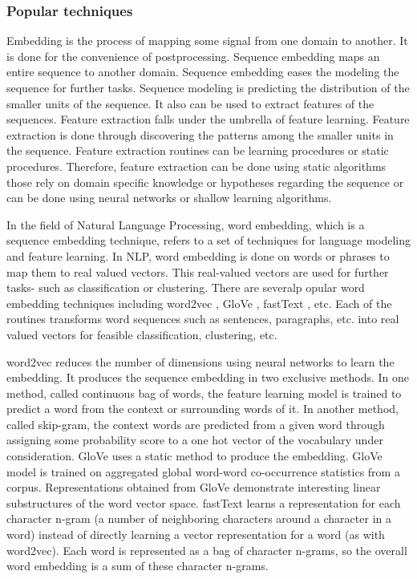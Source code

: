 \documentclass[oneside, twocolumn, a4paper, 10pt]{IEEEtran}
\begin{document}
\subsubsection{Popular techniques}
Embedding is the process of mapping some signal from one domain to another. It is done for the convenience of postprocessing. Sequence embedding maps an entire sequence to another domain. Sequence embedding eases the modeling the sequence for further tasks. Sequence modeling is predicting the distribution of the smaller units of the sequence. It also can be used to extract features of the sequences. Feature extraction falls under the umbrella of feature learning. Feature extraction is done through discovering the patterns among the smaller units in the sequence. Feature extraction routines can be learning procedures or static procedures. Therefore, feature extraction can be done using static algorithms those rely on domain specific knowledge or hypotheses regarding the sequence or can be done using neural networks or shallow learning algorithms.\\
\par 
In the field of Natural Language Processing, word embedding, which is a sequence embedding technique, refers to a set of techniques for language modeling and feature learning. In NLP, word embedding is done on words or phrases to map them to real valued vectors. This real-valued vectors are used for further tasks- such as classification or clustering. There are severalp opular word embedding techniques including word2vec \cite{17}, GloVe \cite{18}, fastText \cite{19} \cite{20}, etc. Each of the routines transforms word sequences such as sentences, paragraphs, etc. into real valued vectors for feasible classification, clustering, etc.\\
\par 
word2vec reduces the number of dimensions using neural networks to learn the embedding. It produces the sequence embedding in two exclusive methods. In one method, called continuous bag of words, the feature learning model is trained to predict a word from the context or surrounding words of it. In another method, called skip-gram, the context words are predicted from a given word through assigning some probability score to a one hot vector of the vocabulary under consideration. GloVe uses a static method to produce the embedding. GloVe model is trained on aggregated global word-word co-occurrence statistics from a corpus. Representations obtained from GloVe demonstrate interesting linear substructures of the word vector space. fastText learns a representation for each character n-gram (a number of neighboring characters around a character in a word) instead of directly learning a vector representation for a word (as with word2vec). Each word is represented as a bag of character n-grams, so the overall word embedding is a sum of these character n-grams.
\end{document}
